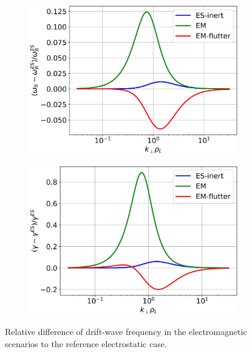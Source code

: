 \begin{figure}[H]
	\centering
	\begin{subfigure}[t]{0.45\textwidth}
		\centering
		\includegraphics[width=1\textwidth]{schemes/comparison_DW_real.png}
		\label{fig:anal_comparisonDWreal}
	\end{subfigure}
	\begin{subfigure}[t]{0.45\textwidth}
		\centering
		\includegraphics[width=1\textwidth]{schemes/comparison_DW_imag.png}
		\label{fig:anal_comparisonDWimag}
	\end{subfigure}
	\caption[Relative difference of drift-wave frequency in the electromagnetic scenarios to the reference electrostatic case]{Relative difference of drift-wave frequency in the electromagnetic scenarios to the reference electrostatic case.} 
	\label{fig:anal_comparisonDW}
\end{figure}

